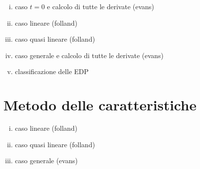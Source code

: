 \begin{enumerate}[i.]
\item
caso $t=0$ e calcolo di tutte le derivate (evans)
\item
caso lineare (folland)
\item
caso quasi lineare (folland)
\item
caso generale e calcolo di tutte le derivate (evans)
\item 
classificazione delle EDP
\end{enumerate}


\section{Metodo delle caratteristiche}

\begin{enumerate}[i.]
\item
caso lineare (folland)
\item
caso quasi lineare (folland)
\item
caso generale (evans)
\end{enumerate}
